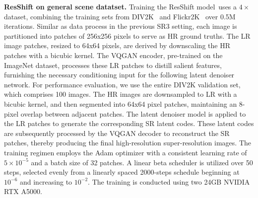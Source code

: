 \textbf{ResShift on general scene datatset.} Training the ResShift model~\cite{yue2023resshift}uses a $4\times$ dataset, combining the training sets from DIV2K~\cite{agustsson2017ntire} and Flickr2K~\cite{timofte2017ntire} over 0.5M iterations. Similar as data process in the previous SR3 setting, each image is partitioned into patches of 256x256 pixels to serve as HR ground truths. The LR image patches, resized to 64x64 pixels, are derived by downscaling the HR patches with a bicubic kernel. The VQGAN encoder, pre-trained on the ImageNet dataset, processes these LR patches to distill salient features, furnishing the necessary conditioning input for the following latent denoiser network. For performance evaluation, we use the entire DIV2K validation set, which comprises 100 images. The HR images are downsampled to LR with a bicubic kernel, and then segmented into 64x64 pixel patches, maintaining an 8-pixel overlap between adjacent patches. The latent denoiser model is applied to the LR patches to generate the corresponding SR latent codes. These latent codes are subsequently processed by the VQGAN decoder to reconstruct the SR patches, thereby producing the final high-resolution super-resolution images. The training regimen employs the Adam optimizer with a consistent learning rate of $5\times10^{-5}$ and a batch size of 32 patches. A linear beta scheduler is utilized over 50 steps, selected evenly from a linearly spaced 2000-steps schedule beginning at $10^{-6}$ and increasing to $10^{-2}$. The training is conducted using two 24GB NVIDIA RTX A5000.

\begin{table}[t]
\caption{Comparison of training time by using different baselines and datasets. The value denotes the ratio of DREAM$/$standard.}
\vspace{-.1in}
\centering
\label{tab:training-time}
\vspace{-.1in}
\end{table}

